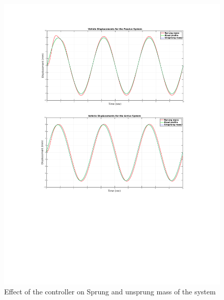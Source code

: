  \begin{figure}[H]
	\centering
	\includegraphics[trim=0cm 9cm 0cm 2cm, clip, width=1\linewidth]{figures/road-sprungs.pdf}
	\caption{Effect of the controller on Sprung and unsprung mass of the system}
	\label{fig:road-sprungs}
\end{figure}

